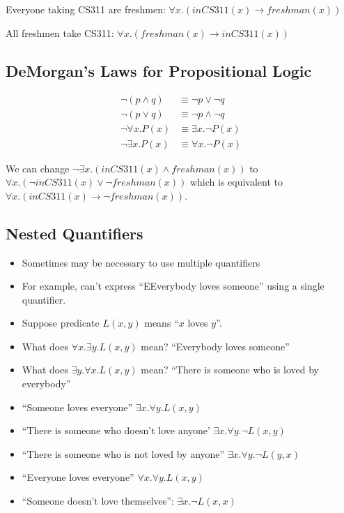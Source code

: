 \documentclass[8pt]{scrreprt}
\begin{document}
\begin{landscape}
\begin{multicols*}{3}
\begin{example}
	Everyone taking CS311 are freshmen: $\forall x.(inCS311(x)\rightarrow freshman(x))$

	All freshmen take CS311: $\forall x.(freshman(x)\rightarrow inCS311(x))$
\end{example}

\subsection{DeMorgan's Laws for Propositional Logic}

\begin{align*}
	\neg (p\land q)     & \equiv \neg p \lor \neg q  \\
	\neg (p\lor q)      & \equiv \neg p \land \neg q \\
	\neg \forall x.P(x) & \equiv \exists x.\neg P(x) \\
	\neg \exists x.P(x) & \equiv \forall x.\neg P(x)
\end{align*}

\begin{example}
	We can change $\neg \exists x.(inCS311(x)\land freshman(x))$ to
	$\forall x.(\neg inCS311(x)\lor \neg freshman(x))$ which is equivalent to
	$\forall x.(inCS311(x)\rightarrow \neg freshman(x))$.
\end{example}

\subsection{Nested Quantifiers}
\begin{itemize}
	\item Sometimes may be necessary to use multiple quantifiers
	\item For example, can't express ``EEverybody loves someone'' using a single quantifier.
	\item Suppose predicate $L(x, y)$ means ``$x$ loves $y$''.
	\item What does $\forall x.\exists y.L(x, y)$ mean? ``Everybody loves someone''
	\item What does $\exists y.\forall x.L(x, y)$ mean? ``There is someone who is loved by everybody''
\end{itemize}

\begin{example}
	\begin{itemize}
		\item ``Someone loves everyone'' $\exists x.\forall y.L(x, y)$
		\item ``There is someone who doesn't love anyone' $\exists x.\forall y.\neg L(x, y)$
		\item ``There is someone who is not loved by anyone'' $\exists x.\forall y. \neg L(y, x)$
		\item ``Everyone loves everyone'' $\forall x.\forall y.L(x, y)$
		\item ``Someone doesn't love themselves'': $\exists x.\neg L(x, x)$
	\end{itemize}
\end{example}


\end{multicols*}
\end{landscape}
\end{document}
